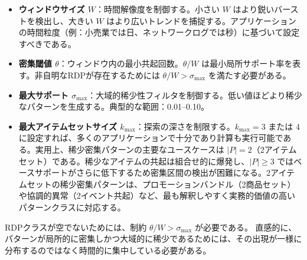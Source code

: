 \begin{itemize}
\item \textbf{ウィンドウサイズ $W$}：時間解像度を制御する。小さい $W$ はより鋭いバーストを検出し、大きい $W$ はより広いトレンドを捕捉する。アプリケーションの時間粒度（例：小売業では日、ネットワークログでは秒）に基づいて設定すべきである。

\item \textbf{密集閾値 $\theta$}：ウィンドウ内の最小共起回数。$\theta / W$ は最小局所サポート率を表す。非自明なRDPが存在するためには $\theta / W > \sigma_{\max}$ を満たす必要がある。

\item \textbf{最大サポート $\sigma_{\max}$}：大域的稀少性フィルタを制御する。低い値ほどより稀少なパターンを生成する。典型的な範囲：0.01--0.10。

\item \textbf{最大アイテムセットサイズ $k_{\max}$}：探索の深さを制限する。$k_{\max} = 3$ または $4$ に設定すれば、多くのアプリケーションで十分であり計算も実行可能である。実用上、稀少密集パターンの主要なユースケースは $|P| = 2$（2アイテムセット）である。稀少なアイテムの共起は組合せ的に爆発し、$|P| \geq 3$ ではベースサポートがさらに低下するため密集区間の検出が困難になる。2アイテムセットの稀少密集パターンは、プロモーションバンドル（2商品セット）や協調的異常（2イベント共起）など、最も解釈しやすく実務的価値の高いパターンクラスに対応する。
\end{itemize}

RDPクラスが空でないためには、制約 $\theta / W > \sigma_{\max}$ が必要である。
直感的に、パターンが局所的に密集しかつ大域的に稀少であるためには、その出現が一様に分布するのではなく時間的に集中している必要がある。
